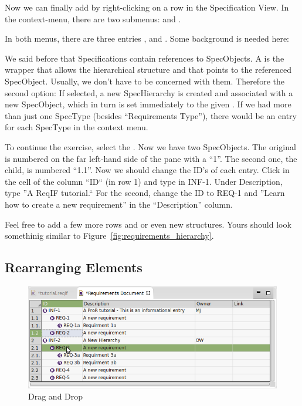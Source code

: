 Now we can finally add  by right-clicking on a row in the Specification View.  In the context-menu, there are two submenus:  and .

In both menus, there are three entries ,  and .  Some background is needed here:

We said before that Specifications contain references to SpecObjects.  A  is the wrapper that allows the hierarchical structure and that points to the referenced SpecObject.  Usually, we don't have to be concerned with them.  Therefore the second option: If selected, a new SpecHierarchy is created and associated with a new SpecObject, which in turn is set immediately to the given .  If we had more than just one SpecType (besides ``Requirements Type''), there would be an entry for each SpecType in the context menu.

To continue the exercise, select the .  Now we have two SpecObjects.  The original is numbered on the far left-hand side of the pane with a ``1''.  The second one, the child, is numbered ``1.1''.  Now we should change the ID's of each entry.  Click in the cell of the column ``ID`` (in row 1) and type in INF-1.  Under Description, type ''A ReqIF tutorial.``  For the second, change the ID to REQ-1 and ''Learn how to create a new requirement'' in the ``Description'' column.

Feel free to add a few more rows and or even new structures.  Yours should look somethinig similar to Figure~\ref{fig:requirements_hierarchy}.

\subsection{Rearranging Elements}
\label{sec:rearrange-elements}

\begin{figure}
\centering
\includegraphics[width=0.8\linewidth]{../rmf-images/draganddrop.png}    
\caption{Drag and Drop}      
\label{fig:dragAndDropChild}
\end{figure}

